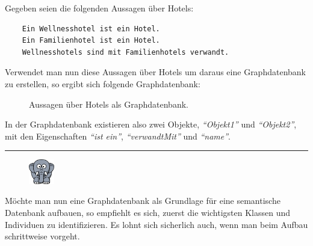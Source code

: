 \newpage

Gegeben seien die folgenden Aussagen über Hotels:
\begin{lstlisting}
    Ein Wellnesshotel ist ein Hotel.
    Ein Familienhotel ist ein Hotel.
    Wellnesshotels sind mit Familienhotels verwandt.
\end{lstlisting}

Verwendet man nun diese Aussagen über Hotels um daraus eine Graphdatenbank zu erstellen, so ergibt sich folgende Graphdatenbank:
\begin{figure}[htbp]
\centering {}
\caption{Aussagen über Hotels als Graphdatenbank.\label{fig:hotels_graphdatenbank}\protect\footnotemark}
\end{figure}

In der Graphdatenbank existieren also zwei Objekte, \textit{``Objekt1''} und \textit{``Objekt2''}, mit den Eigenschaften \textit{``ist ein''}, \textit{``verwandtMit''} und \textit{``name''}.

\newpage

\noindent\rule[1ex]{\textwidth}{1pt}
\begin{figure}
    \vspace{-12pt}
    \includegraphics[width=0.1\textwidth]{bilder/elephant.png}
\end{figure}
\label{elephant_graph_data}
Möchte man nun eine Graphdatenbank als Grundlage für eine semantische Datenbank aufbauen, so empfiehlt es sich, zuerst die wichtigsten Klassen und Individuen  zu identifizieren. Es lohnt sich sicherlich auch, wenn man beim Aufbau schrittweise vorgeht.

